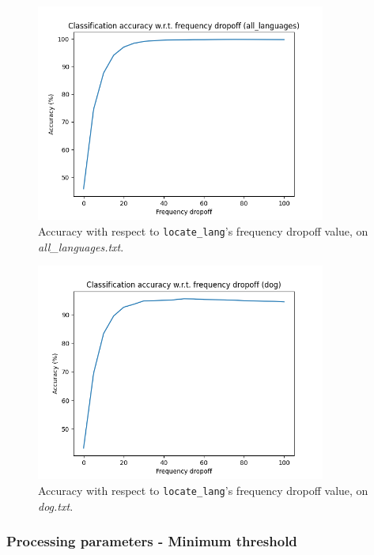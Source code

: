 \documentclass{article}
\begin{document}
\begin{figure}
    \centering
    \includegraphics[width=0.85\textwidth]{../results/all_languages/ll-f.png}
    \caption{Accuracy with respect to \texttt{locate\_lang}'s frequency dropoff value, on \textit{all\_languages.txt}.}
    \label{fig:ll_f_all_languages}
\end{figure}

\begin{figure}
    \centering
    \includegraphics[width=0.85\textwidth]{../results/dog/ll-f.png}
    \caption{Accuracy with respect to \texttt{locate\_lang}'s frequency dropoff value, on \textit{dog.txt}.}
    \label{fig:ll_f_dog}
\end{figure}

\subsubsection{Processing parameters - Minimum threshold}
\label{subsubsec:results_locate_lang_minimum_threshold}
\end{document}
